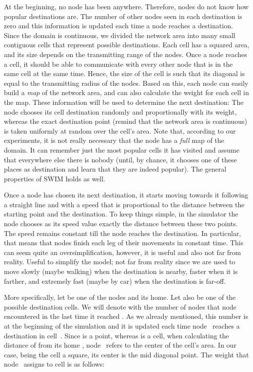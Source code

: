 \documentclass[conference]{IEEEtran}
\begin{document}
At the beginning, no node has been anywhere. Therefore, nodes do not know how
popular destinations are. The number of other nodes seen in each destination is
zero and this information is updated each time a node reaches a destination.
Since the domain is continuous, we divided the network area into many small
contiguous cells that represent possible destinations. Each cell has a squared
area, and its size depends on the transmitting range of the nodes. Once a node
reaches a cell, it should be able to communicate with every other node that is
in the same cell at the same time. Hence, the size of the cell is such that its
diagonal is equal to the transmitting radius of the nodes. Based on this, each
node can easily build a \emph{map} of the network area, and can also calculate
the weight for each cell in the map. These information will be used to
determine the next destination: The node chooses its cell
destination randomly and proportionally with its weight, whereas the exact
destination point (remind that the network area is continuous) is taken
uniformly at random over the cell's area. Note that,
according to our experiments, it is not really necessary that the node has a
\emph{full} map of the domain. It can remember just the most popular cells it
has visited and assume that everywhere else there is nobody (until, by chance,
it chooses one of these places as destination and learn that they are indeed
popular). The general properties of SWIM holds as well.

Once a node has chosen its next destination, it starts moving towards it
following a straight line and with a speed that is proportional to the distance
between the starting point and the destination. To keep things simple, in the
simulator the node chooses as its speed value exactly the distance between these
two points. The speed remains constant till the node reaches the destination. In
particular, that means that nodes finish each leg of their movements in constant
time. This can seem quite an oversimplification, however, it is useful and also
not far from reality. Useful to simplify the model; not far from reality since
we are used to move slowly (maybe walking) when the destination is nearby,
faster when it is farther, and extremely fast (maybe by car) when the
destination is far-off.

More specifically, let  be one of the nodes and  its home. Let also 
be one of the possible destination cells. We will denote with 
the number of nodes that node~ encountered in  the last time it reached
. As we already mentioned, this number is  at the beginning of the
simulation and it is updated each time node~ reaches a destination in
cell~. Since  is a point, whereas  is a cell, when calculating the
distance of  from its home , node~ refers to the center of the cell's
area. In our case, being the cell a square, its center is the mid diagonal
point. The weight that node~ assigns to cell  is as follows:
\end{document}
